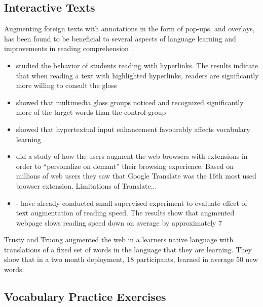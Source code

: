 \subsection{Interactive Texts}

Augmenting foreign texts with annotations in the form of pop-ups, and overlays, has been found to be beneficial to several aspects of language learning \cite{DeRidder02-Links} and improvements in reading comprehension \cite{Sanko06-Effects}.


\begin{itemize}
	\item \cite{DeRidder02-Links} studied the behavior of students reading with hyperlinks.
	The results indicate that when reading a text with highlighted hyperlinks, readers are significantly more willing to consult the gloss 

	\item \cite{Yang09-Glosses} showed that multimedia gloss groups noticed and recognized significantly more of the target words than the control group

	\item \cite{Sanko06-Effects} showed that hypertextual input enhancement favourably affects vocabulary learning

	\item \cite{Diaz15-Augmented} did a study of how the users augment the web browsers with extensions in order to ``personalize on demant'' their browsing experience. Based on millions of web users they saw that Google Translate was the 16th most used browser extension. Limitations of Translate... 


	\item \cite{Horva13-Enriching} 
	- have already conducted small supervised experiment to evaluate effect of text
	augmentation of reading speed. The results show that augmented webpage slows
	reading speed down on average by approximately 7%


\end{itemize}

Trusty and Truong augmented the web in a learners native language with translations of a fixed set of words in the language that they are learning\cite{Trus11web}. They show that in a two month deployment, 18 participants, learned in average 50 new words.


\subsection{Vocabulary Practice Exercises}

